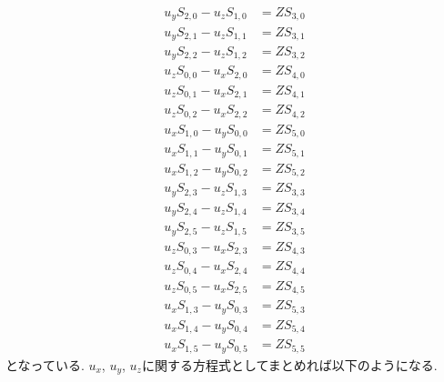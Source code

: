 \documentclass[a4j]{jsarticle}
\begin{document}
\begin{align}
u_{y}S_{2,0}-u_{z}S_{1,0}&=ZS_{3,0}\nonumber\\
u_{y}S_{2,1}-u_{z}S_{1,1}&=ZS_{3,1}\nonumber\\
u_{y}S_{2,2}-u_{z}S_{1,2}&=ZS_{3,2}\nonumber\\
%
u_{z}S_{0,0}-u_{x}S_{2,0}&=ZS_{4,0}\nonumber\\
u_{z}S_{0,1}-u_{x}S_{2,1}&=ZS_{4,1}\nonumber\\
u_{z}S_{0,2}-u_{x}S_{2,2}&=ZS_{4,2}\nonumber\\
%
u_{x}S_{1,0}-u_{y}S_{0,0}&=ZS_{5,0}\nonumber\\
u_{x}S_{1,1}-u_{y}S_{0,1}&=ZS_{5,1}\nonumber\\
u_{x}S_{1,2}-u_{y}S_{0,2}&=ZS_{5,2}\nonumber\\
%
u_{y}S_{2,3}-u_{z}S_{1,3}&=ZS_{3,3}\nonumber\\
u_{y}S_{2,4}-u_{z}S_{1,4}&=ZS_{3,4}\nonumber\\
u_{y}S_{2,5}-u_{z}S_{1,5}&=ZS_{3,5}\nonumber\\
%
u_{z}S_{0,3}-u_{x}S_{2,3}&=ZS_{4,3}\nonumber\\
u_{z}S_{0,4}-u_{x}S_{2,4}&=ZS_{4,4}\nonumber\\
u_{z}S_{0,5}-u_{x}S_{2,5}&=ZS_{4,5}\nonumber\\
%
u_{x}S_{1,3}-u_{y}S_{0,3}&=ZS_{5,3}\nonumber\\
u_{x}S_{1,4}-u_{y}S_{0,4}&=ZS_{5,4}\nonumber\\
u_{x}S_{1,5}-u_{y}S_{0,5}&=ZS_{5,5}\nonumber
\end{align}
となっている. $u_x$, $u_{y}$, $u_{z}$に関する方程式としてまとめれば以下のようになる. 
\end{document}
